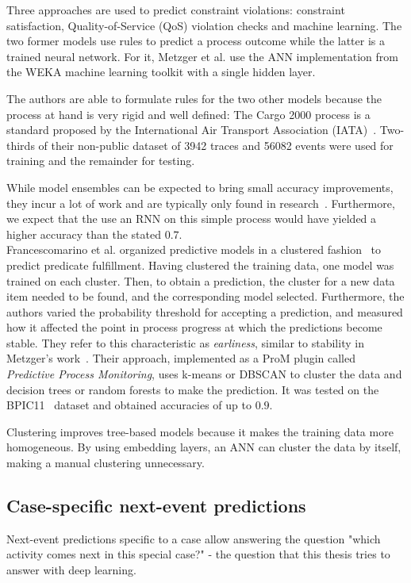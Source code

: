 Three approaches are used to predict constraint violations: constraint satisfaction, Quality-of-Service (QoS) violation checks and machine learning. The two former models use rules to predict a process outcome while the latter is a trained neural network. For it, Metzger et al. use the ANN implementation from the WEKA machine learning toolkit with a single hidden layer.

The authors are able to formulate rules for the two other models because the process at hand is very rigid and well defined: The Cargo 2000 process is a standard proposed by the International Air Transport Association (IATA)~\cite{metzger2015}. Two-thirds of their non-public dataset of 3942 traces and 56082 events were used for training and the remainder for testing.

While model ensembles can be expected to bring small accuracy improvements, they incur a lot of work and are typically only found in research~\cite{lessmannBADS}. Furthermore, we expect that the use an RNN on this simple process would have yielded a higher accuracy than the stated $0.7$.\\

Francescomarino et al. organized predictive models in a clustered fashion~\cite{francescomarino2015} to predict predicate fulfillment. Having clustered the training data, one model was trained on each cluster. Then, to obtain a prediction, the cluster for a new data item needed to be found, and the corresponding model selected. Furthermore, the authors varied the probability threshold for accepting a prediction, and measured how it affected the point in process progress at which the predictions become stable. They refer to this characteristic as \textit{earliness}, similar to stability in Metzger's work~\cite{metzger2015}. Their approach, implemented as a ProM plugin called \textit{Predictive Process Monitoring}, uses k-means or DBSCAN to cluster the data and decision trees or random forests to make the prediction. It was tested on the BPIC11~\cite{BPIC2011} dataset and obtained accuracies of up to $0.9$.

Clustering improves tree-based models because it makes the training data more homogeneous. By using embedding layers, an ANN can cluster the data by itself, making a manual clustering unnecessary.

\subsection*{Case-specific next-event predictions}
Next-event predictions specific to a case allow answering the question "which activity comes next in this special case?" - the question that this thesis tries to answer with deep learning.\\


